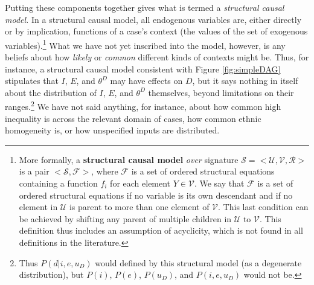 \documentclass[
  12pt,
]{book}
\begin{document}
Putting these components together gives what is termed a \emph{structural causal model.} In a structural causal model, all endogenous variables are, either directly or by implication, functions of a case's context (the values of the set of exogenous variables).\footnote{More formally, a \textbf{structural causal model} \emph{over} signature \(\mathcal{S}=<\mathcal{U},\mathcal{V},\mathcal{R}>\) is a pair \(<\mathcal{S}, \mathcal{F}>\), where \(\mathcal{F}\) is a set of ordered structural equations containing a function \(f_i\) for each element \(Y\in \mathcal{V}\). We say that \(\mathcal{F}\) is a set of ordered structural equations if no variable is its own descendant and if no element in \(\mathcal{U}\) is parent to more than one element of \(\mathcal{V}\). This last condition can be achieved by shifting any parent of multiple children in \(\mathcal{U}\) to \(\mathcal{V}\). This definition thus includes an assumption of acyclicity, which is not found in all definitions in the literature.} What we have not yet inscribed into the model, however, is any beliefs about how \emph{likely} or \emph{common} different kinds of contexts might be. Thus, for instance, a structural causal model consistent with Figure \ref{fig:simpleDAG} stipulates that \(I\), \(E\), and \(\theta^D\) may have effects on \(D\), but it says nothing in itself about the distribution of \(I\), \(E\), and \(\theta^D\) themselves, beyond limitations on their ranges.\footnote{Thus \(P(d|i,e, u_D)\) would defined by this structural model (as a degenerate distribution), but \(P(i)\), \(P(e)\), \(P(u_D)\), and \(P(i,e, u_D)\) would not be.} We have not said anything, for instance, about how common high inequality is across the relevant domain of cases, how common ethnic homogeneity is, or how unspecified inputs are distributed.
\end{document}

